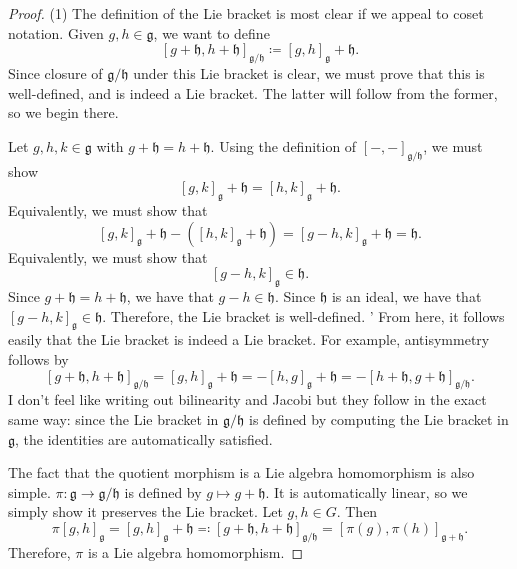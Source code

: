 \documentclass[11pt, letterpaper]{article}
\begin{document}
\begin{proof}
	(1) The definition of the Lie bracket is most clear if we appeal to coset notation. Given $g,h\in \mathfrak{g} $, we want to define
	\[
		\left[ g+\mathfrak{h} ,h+\mathfrak{h}  \right]_{\mathfrak{g} /\mathfrak{h} } \coloneqq \left[ g,h \right]_{\mathfrak{g} } +\mathfrak{h} 
	.\]
	Since closure of $\mathfrak{g} /\mathfrak{h} $ under this Lie bracket is clear, we must prove that this is well-defined, and is indeed a Lie bracket. The latter will follow from the former, so we begin there.

	Let $g,h,k\in \mathfrak{g}$ with $g+\mathfrak{h} =h+\mathfrak{h} $. Using the definition of $[-,-]_{\mathfrak{g} /\mathfrak{h} } $, we must show
	\[
		[g,k]_\mathfrak{g} +\mathfrak{h} =[h,k]_\mathfrak{g} +\mathfrak{h} 
	.\]
	Equivalently, we must show that
	\[
		[g,k]_\mathfrak{g} +\mathfrak{h} -([h,k]_\mathfrak{g} +\mathfrak{h}) =[g-h,k]_\mathfrak{g} +\mathfrak{h} =\mathfrak{h} 
	.\]
	Equivalently, we must show that
	\[
		[g-h,k]_\mathfrak{g}\in \mathfrak{h} 
	.\]
	Since $g+\mathfrak{h} =h+\mathfrak{h} $, we have that $g-h\in \mathfrak{h} $. Since $\mathfrak{h} $ is an ideal, we have that $[g-h,k]_\mathfrak{g} \in \mathfrak{h} $. Therefore, the Lie bracket is well-defined.
	'
	From here, it follows easily that the Lie bracket is indeed a Lie bracket. For example, antisymmetry follows by
	\[
		[g+\mathfrak{h} ,h+\mathfrak{h} ]_{\mathfrak{g} /\mathfrak{h} } =[g,h]_\mathfrak{g} +\mathfrak{h} =-[h,g]_\mathfrak{g} +\mathfrak{h} =-[h+\mathfrak{h} ,g+\mathfrak{h} ]_{\mathfrak{g} /\mathfrak{h} } 
	.\]
	I don't feel like writing out bilinearity and Jacobi but they follow in the exact same way: since the Lie bracket in $\mathfrak{g} /\mathfrak{h} $ is defined by computing the Lie bracket in $\mathfrak{g} $, the identities are automatically satisfied.

	The fact that the quotient morphism is a Lie algebra homomorphism is also simple. $\pi : \mathfrak{g}  \to \mathfrak{g} /\mathfrak{h} $ is defined by $g\mapsto g+\mathfrak{h} $. It is automatically linear, so we simply show it preserves the Lie bracket. Let $g,h\in G$. Then
	\[
		\pi [g,h]_\mathfrak{g} =[g,h]_\mathfrak{g}+\mathfrak{h} \eqqcolon [g+\mathfrak{h} ,h+\mathfrak{h} ]_{\mathfrak{g} /\mathfrak{h} } =[\pi (g),\pi (h)]_{\mathfrak{g} +\mathfrak{h} } 
	.\]
	Therefore, $\pi $ is a Lie algebra homomorphism.


\end{proof}
\end{document}
